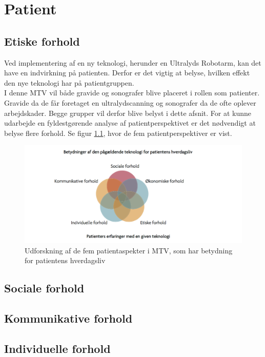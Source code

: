 \chapter{Patient}

\section{Etiske forhold}
Ved implementering af en ny teknologi, herunder en Ultralyds Robotarm, kan det have en indvirkning på patienten. Derfor er det vigtig at belyse, hvilken effekt den nye teknologi har på patientgruppen. \\
I denne MTV vil både gravide og sonografer blive placeret i rollen som patienter. Gravide da de får foretaget en ultralydscanning og sonografer da de ofte oplever arbejdskader. Begge grupper vil derfor blive belyst i dette afsnit.  
\newline
For at kunne udarbejde en fyldestgørende analyse af patientperspektivet er det nødvendigt at belyse flere forhold. Se figur \ref{patientMTV}, hvor de fem patientperspektiver er vist. 
\begin{figure}[h!]\centering
		\includegraphics[width = 1.0\textwidth]{Figurer/PatientaspekterMTV}
		\caption{Udforskning af de fem patientaspekter i MTV, som har betydning for patientens hverdagsliv}
		\label{patientMTV}
\end{figure}

\section{Sociale forhold }
\section{Kommunikative forhold}

\section{Individuelle forhold}
